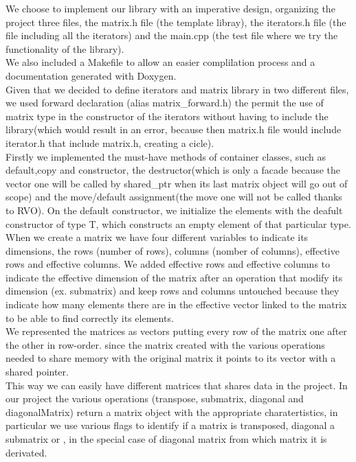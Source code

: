 \documentclass[12pt]{article}%
\begin{document}
We choose to implement our library with an imperative design, organizing the project three files, the matrix.h file (the template libray), the iterators.h file (the file including all the iterators) and the main.cpp (the test file where we try the functionality of the library).\\
We also included a Makefile to allow an easier complilation process and a documentation generated with Doxygen.\\
Given that we decided to define iterators and matrix library in two different files, we used forward declaration (alias matrix\_forward.h) the permit the use of matrix type in the constructor of the iterators without having to include the library(which would result in an error, because then matrix.h file would include iterator.h that include matrix.h, creating a cicle).\\

Firstly we implemented the must-have methods of container classes, such as default,copy and constructor, the destructor(which is only a facade because the vector one will be called by shared\_ptr when its last matrix object will go out of scope) and the move/default assignment(the move one will not be called thanks to RVO).
On the default constructor, we initialize the elements with the deafult constructor of type T, which constructs an empty element of that particular type.  \\
When we create a matrix we have four different variables to indicate its dimensions, the rows (number of rows), columns (nomber of columns), effective rows and effective columns. We added effective rows and effective columns to indicate the effective dimension of the matrix after an operation that modify its dimension (ex. submatrix) and keep rows and columns untouched because they indicate how many elements there are in the effective vector linked to the matrix to be able to find correctly its elements.\\

We represented the matrices as vectors putting every row of the matrix one after the other in row-order.
since the matrix created with the various operations needed to share memory with the original matrix it points to its vector with a shared pointer.\\

This way we can easily have different matrices that shares data in the project.
In our project the various operations (transpose, submatrix, diagonal and diagonalMatrix) return a matrix object with the appropriate charatertistics, in particular we use various flags to identify if a matrix is transposed, diagonal a submatrix or , in the special case of diagonal matrix from which matrix it is derivated.\\
\end{document}
